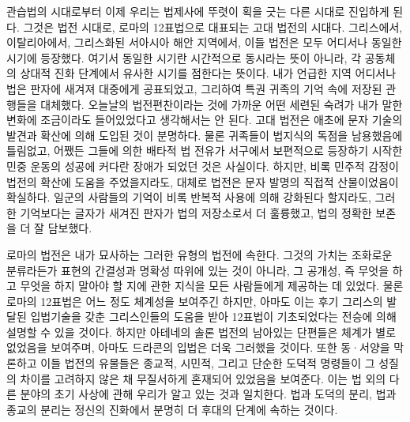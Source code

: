관습법의 시대로부터 이제 우리는 법제사에 뚜렷이 획을 긋는 다른
시대로 진입하게 된다.
그것은 법전 시대로,
로마의 12표법으로 대표되는 고대 법전의 시대다.
그리스에서, 이탈리아에서, 그리스화된 서아시아 해안 지역에서,
이들 법전은 모두 어디서나 동일한 시기에 등장했다.
여기서 동일한 시기란
시간적으로 동시라는 뜻이 아니라,
각 공동체의 상대적 진화 단계에서 유사한 시기를 점한다는 뜻이다.
내가 언급한 지역 어디서나 법은 판자에 새겨져 대중에게 공표되었고,
그리하여 특권 귀족의 기억 속에 저장된 관행들을 대체했다.
오늘날의 법전편찬이라는 것에 가까운 어떤 세련된 숙려가
내가 말한 변화에 조금이라도 들어있었다고 생각해서는 안 된다.
고대 법전은 애초에 문자 기술의 발견과 확산에 의해 도입된 것이 분명하다.
물론 귀족들이 법지식의 독점을 남용했음에 틀림없고,
어쨌든 그들에 의한 배타적 법 전유가 서구에서 보편적으로 등장하기 시작한
민중 운동의 성공에 커다란 장애가 되었던 것은 사실이다.
하지만, 비록 민주적 감정이 법전의 확산에 도움을 주었을지라도,
대체로 법전은 문자 발명의 직접적 산물이었음이 확실하다.
일군의 사람들의 기억이
비록 반복적 사용에 의해 강화된다 할지라도,
그러한 기억보다는
글자가 새겨진 판자가 법의 저장소로서 더 훌륭했고,
법의 정확한 보존을 더 잘 담보했다.

로마의 법전은 내가 묘사하는 그러한 유형의 법전에 속한다.
그것의 가치는 조화로운 분류라든가 표현의 간결성과 명확성 따위에
있는 것이 아니라, 그 공개성, 즉 무엇을 하고 무엇을 하지 말아야 할 지에 관한
지식을 모든 사람들에게 제공하는 데 있었다.
물론 로마의 12표법은 어느 정도 체계성을 보여주긴 하지만,
아마도 이는 후기 그리스의 발달된 입법기술을 갖춘 그리스인들의 도움을 받아
12표법이 기초되었다는 전승에 의해 설명할 수 있을 것이다.
하지만 아테네의 솔론 법전의 남아있는 단편들은
체계가 별로 없었음을 보여주며, 아마도 드라콘의 입법은 더욱 그러했을 것이다.
또한 동^^b7서양을 막론하고 이들 법전의 유물들은
종교적, 시민적, 그리고 단순한 도덕적 명령들이
그 성질의 차이를 고려하지 않은 채 무질서하게 혼재되어 있었음을 보여준다.
이는 법 외의 다른 분야의 초기 사상에 관해 우리가 알고 있는 것과 일치한다.
법과 도덕의 분리, 법과 종교의 분리는 정신의 진화에서
분명히 더 후대의 단계에 속하는 것이다.

